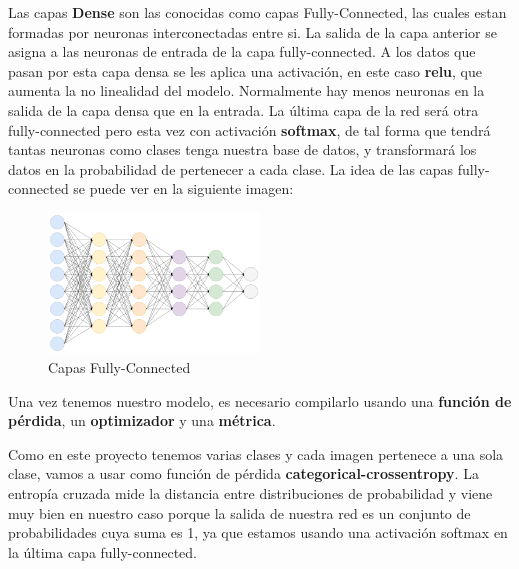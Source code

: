 \vspace{5 mm}

Las capas \textbf{Dense} son las conocidas como capas Fully-Connected, las cuales estan formadas por neuronas interconectadas entre si. La salida de la capa anterior se asigna a las neuronas de entrada de la capa fully-connected. A los datos que pasan por esta capa densa se les aplica una activación, en este caso \textbf{relu}, que aumenta la no linealidad del modelo. Normalmente hay menos neuronas en la salida de la capa densa que en la entrada.
La última capa de la red será otra fully-connected pero esta vez con activación \textbf{softmax}, de tal forma que tendrá tantas neuronas como clases tenga nuestra base de datos, y transformará los datos en la probabilidad de pertenecer a cada clase. La idea de las capas fully-connected se puede ver en la siguiente imagen:

\vspace{5 mm}

\begin{figure}[H]
\centering
  \includegraphics[width=0.5\textwidth]{Imagenes/fully.png}
   \caption{Capas Fully-Connected}
\end{figure}

\vspace{5 mm}

Una vez tenemos nuestro modelo, es necesario compilarlo usando una \textbf{función de pérdida}, un \textbf{optimizador} y una \textbf{métrica}.

\vspace{2 mm}

Como en este proyecto tenemos varias clases y cada imagen pertenece a una sola clase, vamos a usar como función de pérdida \textbf{categorical-crossentropy}. La entropía cruzada mide la distancia entre distribuciones de probabilidad y viene muy bien en nuestro caso porque la salida de nuestra red es un conjunto de probabilidades cuya suma es 1, ya que estamos usando una activación softmax en la última capa fully-connected.

\vspace{2 mm}

